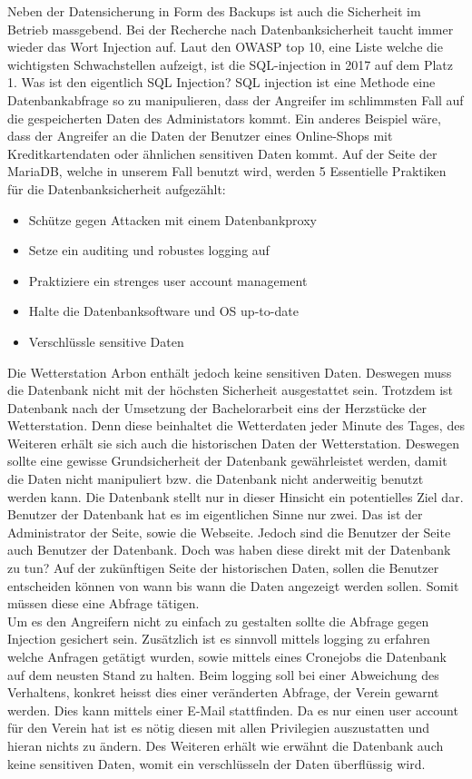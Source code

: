 Neben der Datensicherung in Form des Backups ist auch die Sicherheit im Betrieb massgebend. Bei der Recherche nach Datenbanksicherheit taucht immer wieder das Wort Injection auf. Laut den OWASP top 10, eine Liste welche die wichtigsten Schwachstellen aufzeigt, ist die SQL-injection in 2017 auf dem Platz 1. Was ist den eigentlich SQL Injection? SQL injection ist eine Methode eine Datenbankabfrage so zu manipulieren, dass der Angreifer im schlimmsten Fall auf die gespeicherten Daten des Administators kommt. Ein anderes Beispiel wäre, dass der Angreifer an die Daten der Benutzer eines Online-Shops mit Kreditkartendaten oder ähnlichen sensitiven Daten kommt. Auf der Seite der MariaDB, welche in unserem Fall benutzt wird, werden 5 Essentielle Praktiken für die Datenbanksicherheit aufgezählt:
\begin{itemize}
\item Schütze gegen Attacken mit einem Datenbankproxy
\item Setze ein auditing und robustes logging auf
\item Praktiziere ein strenges user account management
\item Halte die Datenbanksoftware und OS up-to-date
\item Verschlüssle sensitive Daten
\end{itemize}

Die Wetterstation Arbon enthält jedoch keine sensitiven Daten. Deswegen muss die Datenbank nicht mit der höchsten Sicherheit ausgestattet sein.  Trotzdem ist Datenbank nach der Umsetzung der Bachelorarbeit eins der Herzstücke der Wetterstation. Denn diese beinhaltet die Wetterdaten jeder Minute des Tages, des Weiteren erhält sie sich auch die historischen Daten der Wetterstation. Deswegen sollte eine gewisse Grundsicherheit der Datenbank gewährleistet werden, damit die Daten nicht manipuliert bzw. die Datenbank nicht anderweitig benutzt werden kann. Die Datenbank stellt nur in dieser Hinsicht ein potentielles Ziel dar. Benutzer der Datenbank hat es im eigentlichen Sinne nur zwei. Das ist der Administrator der Seite, sowie die Webseite. Jedoch sind die Benutzer der Seite auch Benutzer der Datenbank. Doch was haben diese direkt mit der Datenbank zu tun? Auf der zukünftigen Seite der historischen Daten, sollen die Benutzer entscheiden können von wann bis wann die Daten angezeigt werden sollen. Somit müssen diese eine Abfrage tätigen.\\
Um es den Angreifern nicht zu einfach zu gestalten sollte die Abfrage gegen Injection gesichert sein. Zusätzlich ist es sinnvoll mittels logging zu erfahren welche Anfragen getätigt wurden, sowie mittels eines Cronejobs die Datenbank auf dem neusten Stand zu halten. Beim logging soll bei einer Abweichung des Verhaltens, konkret heisst dies einer veränderten Abfrage, der Verein gewarnt werden. Dies kann mittels einer E-Mail stattfinden. Da es nur einen user account für den Verein hat ist es nötig diesen mit allen Privilegien auszustatten und hieran nichts zu ändern. Des Weiteren erhält wie erwähnt die Datenbank auch keine sensitiven Daten, womit ein verschlüsseln der Daten überflüssig wird. 

